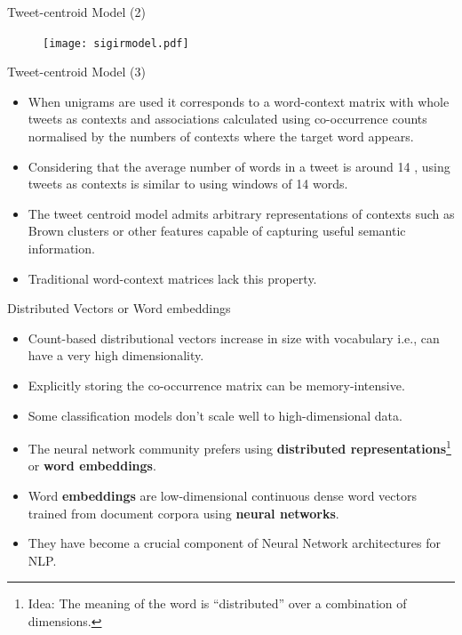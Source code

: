 \begin{frame}{Tweet-centroid Model (2)}


\begin{figure}[htb]
	\centering
	 \texttt{[image: sigirmodel.pdf]}
\end{figure}



\end{frame}


\begin{frame}{Tweet-centroid Model (3)}
\begin{scriptsize}
\begin{itemize}
\item When unigrams are used it corresponds to a word-context matrix with whole tweets as contexts and associations calculated using co-occurrence counts normalised by the numbers of contexts where the target word appears.
\item Considering that the average number of words in a tweet is around 14 \cite{guo2013linking}, using tweets as contexts is similar to using windows of 14 words. 
\item The tweet centroid model admits arbitrary representations of contexts such as Brown clusters or other features capable of capturing useful semantic information. 
\item Traditional word-context matrices lack this property.
\end{itemize}
\end{scriptsize}
\end{frame}

\begin{frame}{Distributed Vectors or Word embeddings}
\begin{scriptsize}
\begin{itemize}

\item Count-based distributional vectors increase in size with vocabulary i.e., can have a very high dimensionality.

\item Explicitly storing the co-occurrence matrix can be memory-intensive. 

\item Some classification models don't scale well to high-dimensional data.

\item  The neural network community prefers using \textbf{distributed representations}\footnote{Idea: The meaning of the word is ``distributed'' over a combination of dimensions.} or \textbf{word embeddings}.

\item  Word \textbf{embeddings} are low-dimensional continuous dense word vectors trained from document corpora using \textbf{neural networks}.

\item They have become a crucial component of Neural Network architectures for NLP.


\end{itemize}
\end{scriptsize}
\end{frame}






